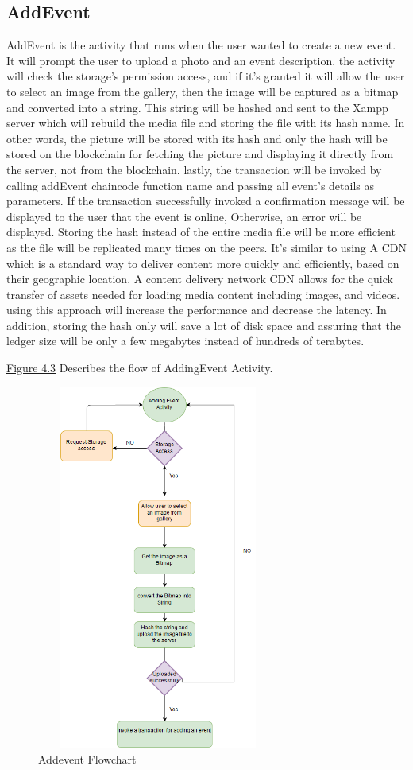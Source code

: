 \subsection{AddEvent}
AddEvent is the activity that runs when the user wanted to create a new event. It will prompt the user to upload a photo and an event description. the activity will check the storage's permission access, and if it's granted it will allow the user to select an image from the gallery, then the image will be captured as a bitmap and converted into a string. This string will be hashed and sent to the Xampp server which will rebuild the media file and storing the file with its hash name. In other words, the picture will be stored with its hash and only the hash will be stored on the blockchain for fetching the picture and displaying it directly from the server, not from the blockchain. lastly, the transaction will be invoked by calling addEvent chaincode function name and passing all event's details as parameters.
If the transaction successfully invoked a confirmation message will be displayed to the user that the event is online, Otherwise, an error will be displayed. 
 Storing the hash instead of the entire media file will be more efficient as the file will be replicated many times on the peers.
It's similar to using A CDN which is a standard way to deliver content more quickly and efficiently, based on their geographic location. A content delivery network CDN allows for the quick transfer of assets needed for loading media content including images, and videos. using this approach will increase the performance and decrease the latency. In addition, storing the hash only will save a lot of disk space and assuring that the ledger size will be only a few megabytes instead of hundreds of terabytes. 
   
\hyperref[fig:mainactivityflow]{Figure 4.3} Describes the flow of AddingEvent Activity. 
 \begin{figure}[H]
\center
\includegraphics[width=8cm,height=12cm]{images/addingeventflowchart.png}
\caption{Addevent Flowchart}
\label{fig:addingeventflowchart}
\end{figure}


